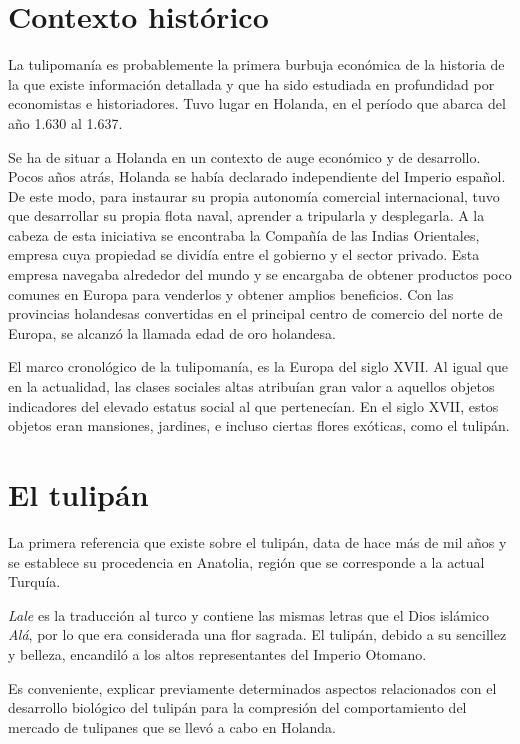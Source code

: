 \section{Contexto histórico}

La tulipomanía es probablemente la primera burbuja económica de la historia de la que existe información detallada y que ha sido estudiada en profundidad por economistas e historiadores. Tuvo lugar en Holanda, en el período que abarca del año 1.630 al 1.637.

Se ha de situar a Holanda en un contexto de auge económico y de desarrollo. Pocos años atrás, Holanda se había declarado independiente del Imperio español. De este modo, para instaurar su propia autonomía comercial internacional, tuvo que desarrollar su propia flota naval, aprender a tripularla y desplegarla. A la cabeza de esta iniciativa se encontraba la Compañía de las Indias Orientales, empresa cuya propiedad se dividía entre el gobierno y el sector privado. Esta empresa navegaba alrededor del mundo y se encargaba de obtener productos poco comunes en Europa para venderlos y obtener amplios beneficios. Con las provincias holandesas convertidas en el principal centro de comercio del norte de Europa, se alcanzó la llamada edad de oro holandesa.

El marco cronológico de la tulipomanía, es la Europa del siglo XVII. Al igual que en la actualidad, las clases sociales altas atribuían gran valor a aquellos objetos indicadores del elevado estatus social al que pertenecían. En el siglo XVII, estos objetos eran mansiones, jardines, e incluso ciertas flores exóticas, como el tulipán.

\section{El tulipán}

La primera referencia que existe sobre el tulipán, data de hace más de mil años y se establece su procedencia en Anatolia, región que se corresponde a la actual Turquía. 

\emph{Lale} es la traducción al turco y contiene las mismas letras que el Dios islámico \emph{Alá}, por lo que era considerada una flor sagrada. El tulipán, debido a su sencillez y belleza, encandiló a los altos representantes del Imperio Otomano.

Es conveniente, explicar previamente determinados aspectos relacionados con el desarrollo biológico del tulipán para la compresión del comportamiento del mercado de tulipanes que se llevó a cabo en Holanda.

